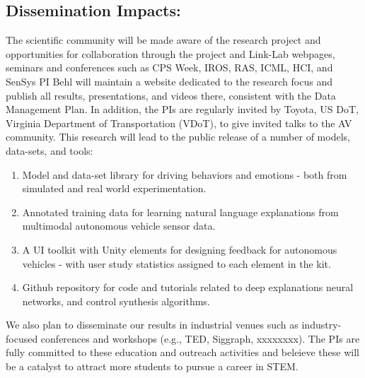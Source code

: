 \subsection{Dissemination Impacts:}
The scientific community will be made aware of the research project and opportunities for collaboration through the project and Link-Lab webpages, seminars and conferences such as CPS Week, IROS, RAS, ICML, HCI, and SenSys
PI Behl will maintain a website dedicated to the research focus and publish all results, presentations, and videos there, consistent with the Data Management Plan. 
In addition, the PIs are regularly invited by Toyota, US DoT, Virginia Department of Transportation (VDoT), to give invited talks to the AV community.
This research will lead to the public release of a number of models, data-sets, and tools:
\begin{enumerate}[itemsep=0pt,parsep=0pt,topsep=4pt,leftmargin=0.4in]
    \item Model and data-set library for driving behaviors and emotions - both from simulated and real world experimentation. 
    \item Annotated training data for learning natural language explanations from multimodal autonomous vehicle sensor data.
    \item A UI toolkit with Unity elements for designing feedback for autonomous vehicles - with user study statistics assigned to each element in the kit.
    \item Github repository for code and tutorials related to deep explanations neural networks, and control synthesis algorithms. 
\end{enumerate}
We also plan to disseminate our results in industrial venues such as industry-focused conferences and workshops (e.g., TED, Siggraph, xxxxxxxx).
The PIs are fully committed to these education and outreach activities and beleieve these will be a catalyst to attract more students to pursue a career in STEM.